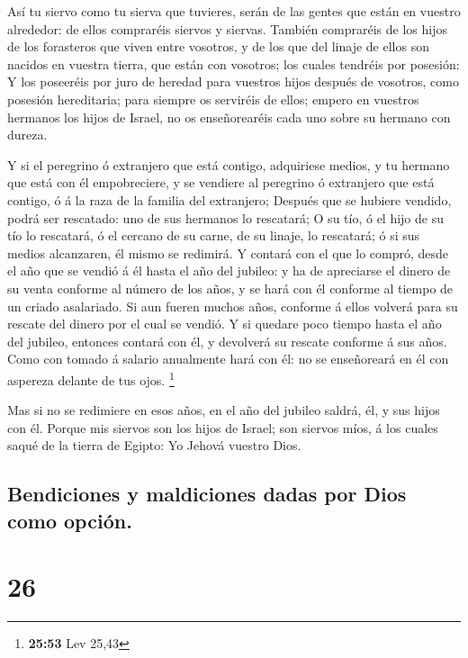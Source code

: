  Así tu siervo como tu sierva que tuvieres, serán de las
gentes que están en vuestro alrededor: de ellos compraréis siervos y
siervas.  También compraréis de los hijos de los forasteros
que viven entre vosotros, y de los que del linaje de ellos son nacidos
en vuestra tierra, que están con vosotros; los cuales tendréis por
posesión:  Y los poseeréis por juro de heredad para
vuestros hijos después de vosotros, como posesión hereditaria; para
siempre os serviréis de ellos; empero en vuestros hermanos los hijos de
Israel, no os enseñorearéis cada uno sobre su hermano con dureza.

 Y si el peregrino ó extranjero que está contigo,
adquiriese medios, y tu hermano que está con él empobreciere, y se
vendiere al peregrino ó extranjero que está contigo, ó á la raza de la
familia del extranjero;  Después que se hubiere vendido,
podrá ser rescatado: uno de sus hermanos lo rescatará;  O
su tío, ó el hijo de su tío lo rescatará, ó el cercano de su carne, de
su linaje, lo rescatará; ó si sus medios alcanzaren, él mismo se
redimirá.  Y contará con el que lo compró, desde el año que
se vendió á él hasta el año del jubileo: y ha de apreciarse el dinero de
su venta conforme al número de los años, y se hará con él conforme al
tiempo de un criado asalariado.  Si aun fueren muchos años,
conforme á ellos volverá para su rescate del dinero por el cual se
vendió.  Y si quedare poco tiempo hasta el año del jubileo,
entonces contará con él, y devolverá su rescate conforme á sus años.
 Como con tomado á salario anualmente hará con él: no se
enseñoreará en él con aspereza delante de tus ojos. \footnote{\textbf{25:53}
  Lev 25,43}

 Mas si no se redimiere en esos años, en el año del jubileo
saldrá, él, y sus hijos con él.  Porque mis siervos son los
hijos de Israel; son siervos míos, á los cuales saqué de la tierra de
Egipto: Yo Jehová vuestro Dios.

\hypertarget{bendiciones-y-maldiciones-dadas-por-dios-como-opciuxf3n.}{%
\subsection{Bendiciones y maldiciones dadas por Dios como
opción.}\label{bendiciones-y-maldiciones-dadas-por-dios-como-opciuxf3n.}}

\hypertarget{section-25}{%
\section{26}\label{section-25}}

